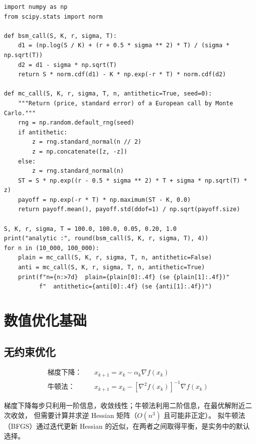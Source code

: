\begin{lstlisting}[style=pythonstyle, caption={蒙特卡洛定价与对偶变量的方差缩减验证}, label={lst:05-mc}]
import numpy as np
from scipy.stats import norm

def bsm_call(S, K, r, sigma, T):
    d1 = (np.log(S / K) + (r + 0.5 * sigma ** 2) * T) / (sigma * np.sqrt(T))
    d2 = d1 - sigma * np.sqrt(T)
    return S * norm.cdf(d1) - K * np.exp(-r * T) * norm.cdf(d2)

def mc_call(S, K, r, sigma, T, n, antithetic=True, seed=0):
    """Return (price, standard error) of a European call by Monte Carlo."""
    rng = np.random.default_rng(seed)
    if antithetic:
        z = rng.standard_normal(n // 2)
        z = np.concatenate([z, -z])
    else:
        z = rng.standard_normal(n)
    ST = S * np.exp((r - 0.5 * sigma ** 2) * T + sigma * np.sqrt(T) * z)
    payoff = np.exp(-r * T) * np.maximum(ST - K, 0.0)
    return payoff.mean(), payoff.std(ddof=1) / np.sqrt(payoff.size)

S, K, r, sigma, T = 100.0, 100.0, 0.05, 0.20, 1.0
print("analytic :", round(bsm_call(S, K, r, sigma, T), 4))
for n in (10_000, 100_000):
    plain = mc_call(S, K, r, sigma, T, n, antithetic=False)
    anti = mc_call(S, K, r, sigma, T, n, antithetic=True)
    print(f"n={n:>7d}  plain={plain[0]:.4f} (se {plain[1]:.4f})"
          f"  antithetic={anti[0]:.4f} (se {anti[1]:.4f})")
\end{lstlisting}

\section{数值优化基础}

\subsection{无约束优化}

\begin{align}
  \text{梯度下降：}\quad & x_{k+1} = x_k - \alpha_k\nabla f(x_k) \label{eq:05-gd}\\
  \text{牛顿法：}\quad & x_{k+1} = x_k - \left[\nabla^2 f(x_k)\right]^{-1}\nabla f(x_k) \label{eq:05-newton}
\end{align}

梯度下降每步只利用一阶信息，收敛线性；牛顿法利用二阶信息，在最优解附近二次收敛，
但需要计算并求逆 Hessian 矩阵（$O(n^3)$ 且可能非正定）。
拟牛顿法（BFGS）通过迭代更新 Hessian 的近似，在两者之间取得平衡，是实务中的默认选择。

